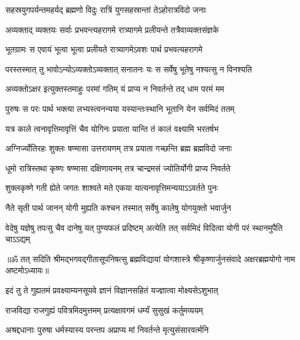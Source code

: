 \twolineshloka
{सहस्रयुगपर्यन्तमहर्यद् ब्रह्मणो विदुः}
{रात्रिं युगसहस्रान्तां तेऽहोरात्रविदो जनाः}%

\twolineshloka
{अव्यक्ताद् व्यक्तयः सर्वाः प्रभवन्त्यहरागमे}
{रात्र्यागमे प्रलीयन्ते तत्रैवाव्यक्तसंज्ञके}%

\twolineshloka
{भूतग्रामः स एवायं भूत्वा भूत्वा प्रलीयते}
{रात्र्यागमेऽवशः पार्थ प्रभवत्यहरागमे}%

\twolineshloka
{परस्तस्मात् तु भावोऽन्योऽव्यक्तोऽव्यक्तात् सनातनः}
{यः स सर्वेषु भूतेषु नश्यत्सु न विनश्यति}%

\twolineshloka
{अव्यक्तोऽक्षर इत्युक्तस्तमाहुः परमां गतिम्}
{यं प्राप्य न निवर्तन्ते तद् धाम परमं मम}%

\twolineshloka
{पुरुषः स परः पार्थ भक्त्या लभ्यस्त्वनन्यया}
{यस्यान्तःस्थानि भूतानि येन सर्वमिदं ततम्}%

\twolineshloka
{यत्र काले त्वनावृत्तिमावृत्तिं चैव योगिनः}
{प्रयाता यान्ति तं कालं वक्ष्यामि भरतर्षभ}%

\twolineshloka
{अग्निर्ज्योतिरहः शुक्लः षण्मासा उत्तरायणम्}
{तत्र प्रयाता गच्छन्ति ब्रह्म ब्रह्मविदो जनाः}%

\twolineshloka
{धूमो रात्रिस्तथा कृष्णः षण्मासा दक्षिणायनम्}
{तत्र चान्द्रमसं ज्योतिर्योगी प्राप्य निवर्तते}%

\twolineshloka
{शुक्लकृष्णे गती ह्येते जगतः शाश्वते मते}
{एकया यात्यनावृत्तिमन्ययाऽऽवर्तते पुनः}%

\twolineshloka
{नैते सृती पार्थ जानन् योगी मुह्यति कश्चन}
{तस्मात् सर्वेषु कालेषु योगयुक्तो भवार्जुन}%

\fourlineindentedshloka
{वेदेषु यज्ञेषु तपःसु चैव}
{दानेषु यत् पुण्यफलं प्रदिष्टम्}
{अत्येति तत् सर्वमिदं विदित्वा}
{योगी परं स्थानमुपैति चाऽऽद्यम्}%

{॥ॐ तत् सदिति श्रीमद्भगवद्गीतासूपनिषत्सु ब्रह्मविद्यायां योगशास्त्रे श्रीकृष्णार्जुनसंवादे अक्षरब्रह्मयोगो नाम अष्टमोऽध्यायः॥}



\twolineshloka
{इदं तु ते गुह्यतमं प्रवक्ष्याम्यनसूयवे}
{ज्ञानं विज्ञानसहितं यज्ज्ञात्वा मोक्ष्यसेऽशुभात्}%

\twolineshloka
{राजविद्या राजगुह्यं पवित्रमिदमुत्तमम्}
{प्रत्यक्षावगमं धर्म्यं सुसुखं कर्तुमव्ययम्}%

\twolineshloka
{अश्रद्दधानाः पुरुषा धर्मस्यास्य परन्तप}
{अप्राप्य मां निवर्तन्ते मृत्युसंसारवर्त्मनि}%

